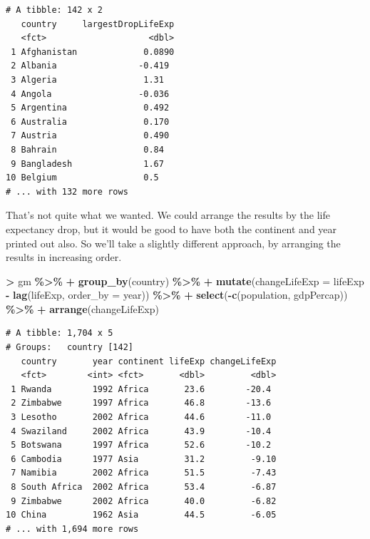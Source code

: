 \documentclass[
]{krantz}
\makeatletter
\newenvironment{Shaded}{\begin{snugshade}}{\end{snugshade}}
\newcommand{\DataTypeTok}[1]{\textcolor[rgb]{0.27,0.27,0.27}{#1}}
\newcommand{\KeywordTok}[1]{\textcolor[rgb]{0.27,0.27,0.27}{\textbf{#1}}}
\newcommand{\NormalTok}[1]{#1}
\newcommand{\OperatorTok}[1]{\textcolor[rgb]{0.43,0.43,0.43}{\textbf{#1}}}
\newcommand{\StringTok}[1]{\textcolor[rgb]{0.5,0.5,0.5}{#1}}
\newenvironment{kframe}{%
\medskip{}
\setlength{\fboxsep}{.8em}
 \def\at@end@of@kframe{}%
 \ifinner\ifhmode%
  \def\at@end@of@kframe{\end{minipage}}%
  \begin{minipage}{\columnwidth}%
 \fi\fi%
 \def\FrameCommand##1{\hskip\@totalleftmargin \hskip-\fboxsep
 \colorbox{shadecolor}{##1}\hskip-\fboxsep
     \hskip-\linewidth \hskip-\@totalleftmargin \hskip\columnwidth}%
 \MakeFramed {\advance\hsize-\width
   \@totalleftmargin\z@ \linewidth\hsize
   \@setminipage}}%
 {\par\unskip\endMakeFramed%
 \at@end@of@kframe}
\renewenvironment{Shaded}{\begin{kframe}}{\end{kframe}}
\makeatother
\begin{document}
\begin{verbatim}
# A tibble: 142 x 2
   country     largestDropLifeExp
   <fct>                    <dbl>
 1 Afghanistan             0.0890
 2 Albania                -0.419 
 3 Algeria                 1.31  
 4 Angola                 -0.036 
 5 Argentina               0.492 
 6 Australia               0.170 
 7 Austria                 0.490 
 8 Bahrain                 0.84  
 9 Bangladesh              1.67  
10 Belgium                 0.5   
# ... with 132 more rows
\end{verbatim}

That's not quite what we wanted. We could arrange the results by the life expectancy drop, but it would be good to have both the continent and year printed out also. So we'll take a slightly different approach, by arranging the results in increasing order.

\begin{Shaded}
\begin{Highlighting}[]
\OperatorTok{\textgreater{}}\StringTok{ }\NormalTok{gm }\OperatorTok{\%\textgreater{}\%}\StringTok{ }
\OperatorTok{+}\StringTok{   }\KeywordTok{group\_by}\NormalTok{(country) }\OperatorTok{\%\textgreater{}\%}\StringTok{ }
\OperatorTok{+}\StringTok{   }\KeywordTok{mutate}\NormalTok{(}\DataTypeTok{changeLifeExp =}\NormalTok{ lifeExp }\OperatorTok{{-}}\StringTok{ }\KeywordTok{lag}\NormalTok{(lifeExp, }\DataTypeTok{order\_by =}\NormalTok{ year)) }\OperatorTok{\%\textgreater{}\%}\StringTok{ }
\OperatorTok{+}\StringTok{   }\KeywordTok{select}\NormalTok{(}\OperatorTok{{-}}\KeywordTok{c}\NormalTok{(population, gdpPercap)) }\OperatorTok{\%\textgreater{}\%}\StringTok{ }
\OperatorTok{+}\StringTok{   }\KeywordTok{arrange}\NormalTok{(changeLifeExp)}
\end{Highlighting}
\end{Shaded}

\begin{verbatim}
# A tibble: 1,704 x 5
# Groups:   country [142]
   country       year continent lifeExp changeLifeExp
   <fct>        <int> <fct>       <dbl>         <dbl>
 1 Rwanda        1992 Africa       23.6        -20.4 
 2 Zimbabwe      1997 Africa       46.8        -13.6 
 3 Lesotho       2002 Africa       44.6        -11.0 
 4 Swaziland     2002 Africa       43.9        -10.4 
 5 Botswana      1997 Africa       52.6        -10.2 
 6 Cambodia      1977 Asia         31.2         -9.10
 7 Namibia       2002 Africa       51.5         -7.43
 8 South Africa  2002 Africa       53.4         -6.87
 9 Zimbabwe      2002 Africa       40.0         -6.82
10 China         1962 Asia         44.5         -6.05
# ... with 1,694 more rows
\end{verbatim}
\end{document}
